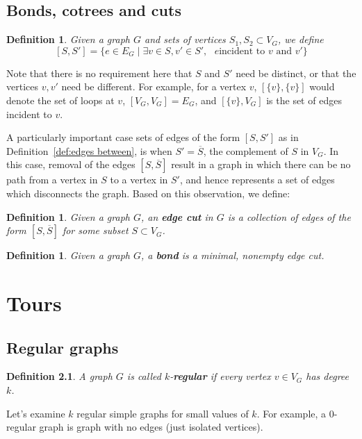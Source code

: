\documentclass[12pt]{report}
\theoremstyle{plain}
\newtheorem{defn}[thm]{Definition}
\newcommand{\Xb}[1]{\textbf{#1}\index{#1}}
\begin{document}
\section{Bonds, cotrees and cuts}

\begin{defn} \label{edges between}
Given a graph $G$ and sets of vertices $S_1, S_2 \subset V_G$, we define
\[ [S, S'] = \{e \in E_G \mid \exists v \in S, v' \in S', \text{ $e$
incident to $v$ and $v'$}\}\]
\end{defn}
Note that there is no requirement here that $S$ and $S'$ need be distinct,
or that the vertices $v, v'$ need be different. For example, for a vertex
$v$, $[\{v\},\{v\}]$ would denote the set of loops at $v$, $[V_G, V_G]
= E_G$, and $[\{v\}, V_G]$ is the set of edges incident to $v$.

A particularly important case sets of edges of the form $[S, S']$ as in
Definition~\ref{def:edges between}, is when $S' = \overline S$, the
complement of $S$ in $V_G$. In this case, removal of the edges $[S,
\overline S]$ result in a graph in which there can be no path from a vertex
in $S$ to a vertex in $S'$, and hence represents a set of edges which
disconnects the graph. Based on this observation, we define:

\begin{defn} \label{def:edge cut}
Given a graph $G$, an \Xb{edge cut} in $G$ is a collection of edges of the
form $[S, \overline S]$ for some subset $S \subset V_G$.
\end{defn}

\begin{defn} \label{def:bond}
Given a graph $G$, a \Xb{bond} is a minimal, nonempty edge cut.
\end{defn}


\chapter{Tours}
\section{Regular graphs}

\begin{defn}
A graph $G$ is called $k$-\Xb{regular} if every vertex $v \in V_G$ has
degree $k$.
\end{defn}

Let's examine $k$ regular simple graphs for small values of $k$. For example, a
$0$-regular graph is graph with no edges (just isolated vertices).
\end{document}
